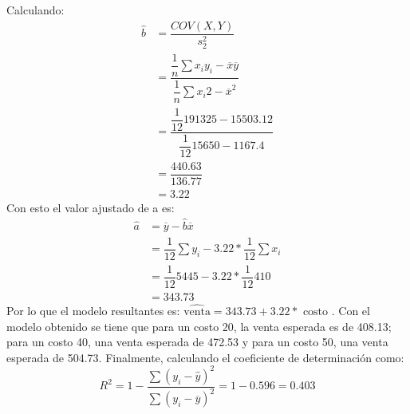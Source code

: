 \noaddpoints
\begin{solution}
    Calculando:
    \begin{align*}
        \hat{b}&=\dfrac{COV(X,Y)}{s_{2}^{2}}\\
        &= \dfrac{\dfrac{1}{n}\sum x_i y_i - \overline{x}\overline{y}}{\dfrac{1}{n}\sum x_{i}{2}-\overline{x}^2}\\
        &= \dfrac{\dfrac{1}{12}191325-15503.12}{\dfrac{1}{12}15650-1167.4}\\
        &= \dfrac{440.63}{136.77} \\
        &= 3.22
    \end{align*}
    Con esto el valor ajustado de a es:
    \begin{align*}
        \hat{a}&= \overline{y}-\hat{b}\overline{x}\\
        &= \dfrac{1}{12}\sum y_i - 3.22 * \dfrac{1}{12}\sum x_i\\
        &= \dfrac{1}{12} 5445 - 3.22 * \dfrac{1}{12} 410\\
        &= 343.73            
    \end{align*}
    Por lo que el modelo resultantes es: $\hat{\text{venta}}=343.73+3.22 * \text{ costo }$.
    Con el modelo obtenido se tiene que para un costo 20, la venta esperada es de 408.13; para un costo 40, una venta esperada de 472.53 y para un costo 50, una venta esperada de 504.73.
    Finalmente, calculando el coeficiente de determinación como:
    $$R^2=1-\dfrac{\sum (y_i -\hat{y})^2}{\sum (y_i - \overline{y})^2}=1-0.596=0.403$$   
\end{solution}

